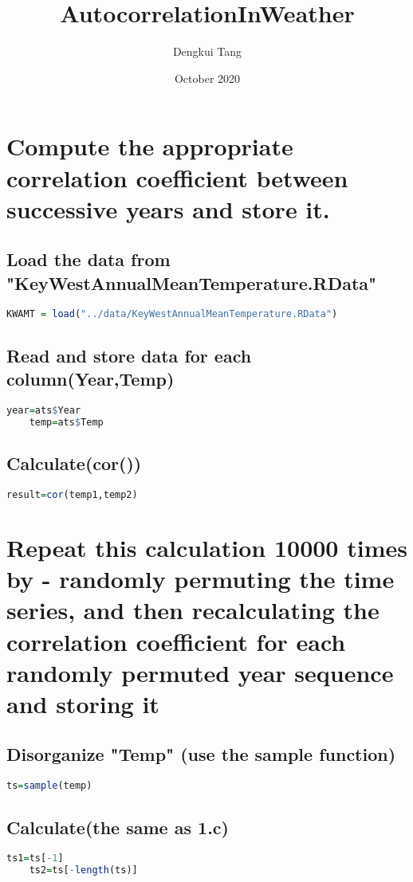 \documentclass[10pt]{article}
\title{AutocorrelationInWeather}
\author{Dengkui Tang}
\date{October 2020}
\begin{document}
\maketitle

\section{Compute the appropriate correlation coefficient between successive years and store it.}
    \subsection{Load the data from "KeyWestAnnualMeanTemperature.RData"}
    \begin{lstlisting}[language={R}]
    KWAMT = load("../data/KeyWestAnnualMeanTemperature.RData")
    \end{lstlisting}
    \subsection{Read and store data for each column(Year,Temp)}
    \begin{lstlisting}[language={R}]
    year=ats$Year
    temp=ats$Temp
    \end{lstlisting}
    \subsection{Calculate(cor())}
    \begin{lstlisting}[language={R}]
    result=cor(temp1,temp2)
    \end{lstlisting}

\section{Repeat this calculation 10000 times by - randomly permuting the time series, and then recalculating the correlation coefficient for each randomly permuted year sequence and storing it}
    \subsection{Disorganize "Temp" (use the sample function)}
    \begin{lstlisting}[language={R}]
    ts=sample(temp)
    \end{lstlisting}
    \subsection{Calculate(the same as 1.c)}
    \begin{lstlisting}[language={R}]
    ts1=ts[-1]
    ts2=ts[-length(ts)]
    \end{lstlisting}
\end{document}
